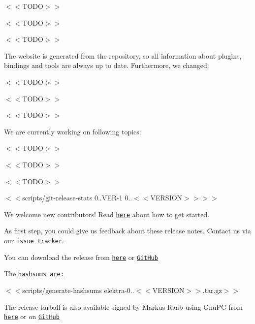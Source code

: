 \begin{DoxyItemize}
\item $<$$<$\+T\+O\+D\+O$>$$>$
\item $<$$<$\+T\+O\+D\+O$>$$>$
\item $<$$<$\+T\+O\+D\+O$>$$>$
\end{DoxyItemize}

The website is generated from the repository, so all information about plugins, bindings and tools are always up to date. Furthermore, we changed\+:


\begin{DoxyItemize}
\item $<$$<$\+T\+O\+D\+O$>$$>$
\item $<$$<$\+T\+O\+D\+O$>$$>$
\item $<$$<$\+T\+O\+D\+O$>$$>$
\end{DoxyItemize}

We are currently working on following topics\+:


\begin{DoxyItemize}
\item $<$$<$\+T\+O\+D\+O$>$$>$
\item $<$$<$\+T\+O\+D\+O$>$$>$
\item $<$$<$\+T\+O\+D\+O$>$$>$
\end{DoxyItemize}

$<$$<${\ttfamily scripts/git-\/release-\/stats 0..\+V\+ER-\/1 0..$<$$<$V\+E\+R\+S\+I\+ON$>$$>$}$>$$>$

We welcome new contributors! Read \href{https://www.libelektra.org/devgettingstarted/ideas}{\tt here} about how to get started.

As first step, you could give us feedback about these release notes. Contact us via our \href{https://issues.libelektra.org}{\tt issue tracker}.

You can download the release from \href{https://www.libelektra.org/ftp/elektra/releases/elektra-0.9.<<VERSION>>.tar.gz}{\tt here} or \href{https://github.com/ElektraInitiative/ftp/blob/master/releases/elektra-0.9.<<VERSION>>.tar.gz?raw=true}{\tt Git\+Hub}

The \href{https://github.com/ElektraInitiative/ftp/blob/master/releases/elektra-0.9.<<VERSION>>.tar.gz.hashsum?raw=true}{\tt hashsums are\+:}

$<$$<${\ttfamily scripts/generate-\/hashsums elektra-\/0..$<$$<$V\+E\+R\+S\+I\+ON$>$$>$.tar.\+gz}$>$$>$

The release tarball is also available signed by Markus Raab using Gnu\+PG from \href{https://www.libelektra.org/ftp/elektra/releases/elektra-0.9.<<VERSION>>.tar.gz.gpg}{\tt here} or on \href{https://github.com/ElektraInitiative/ftp/blob/master/releases/elektra-0.9.<<VERSION>>.tar.gz.gpg?raw=true}{\tt Git\+Hub}

